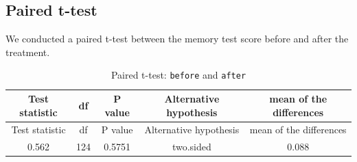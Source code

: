 \documentclass[]{article}
\begin{document}
\subsection{Paired t-test}\label{paired-t-test}

We conducted a paired t-test between the memory test score before and
after the treatment.

\begin{longtable}[]{@{}ccccc@{}}
\caption{Paired t-test: \texttt{before} and
\texttt{after}}\tabularnewline
\toprule
\begin{minipage}[b]{0.18\columnwidth}\centering\strut
Test statistic\strut
\end{minipage} & \begin{minipage}[b]{0.06\columnwidth}\centering\strut
df\strut
\end{minipage} & \begin{minipage}[b]{0.10\columnwidth}\centering\strut
P value\strut
\end{minipage} & \begin{minipage}[b]{0.26\columnwidth}\centering\strut
Alternative hypothesis\strut
\end{minipage} & \begin{minipage}[b]{0.26\columnwidth}\centering\strut
mean of the differences\strut
\end{minipage}\tabularnewline
\midrule
\endfirsthead
\toprule
\begin{minipage}[b]{0.18\columnwidth}\centering\strut
Test statistic\strut
\end{minipage} & \begin{minipage}[b]{0.06\columnwidth}\centering\strut
df\strut
\end{minipage} & \begin{minipage}[b]{0.10\columnwidth}\centering\strut
P value\strut
\end{minipage} & \begin{minipage}[b]{0.26\columnwidth}\centering\strut
Alternative hypothesis\strut
\end{minipage} & \begin{minipage}[b]{0.26\columnwidth}\centering\strut
mean of the differences\strut
\end{minipage}\tabularnewline
\midrule
\endhead
\begin{minipage}[t]{0.18\columnwidth}\centering\strut
0.562\strut
\end{minipage} & \begin{minipage}[t]{0.06\columnwidth}\centering\strut
124\strut
\end{minipage} & \begin{minipage}[t]{0.10\columnwidth}\centering\strut
0.5751\strut
\end{minipage} & \begin{minipage}[t]{0.26\columnwidth}\centering\strut
two.sided\strut
\end{minipage} & \begin{minipage}[t]{0.26\columnwidth}\centering\strut
0.088\strut
\end{minipage}\tabularnewline
\bottomrule
\end{longtable}
\end{document}

